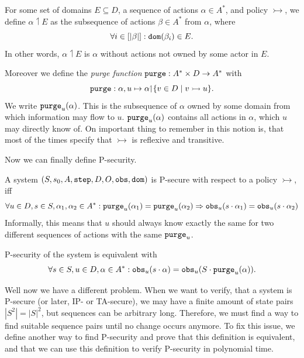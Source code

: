\begin{definition}
    For some set of domains \(E \subseteq D\), a sequence of actions \(\alpha \in A^*\), and policy \(\rightarrowtail\), we define \(\alpha {\upharpoonleft} E\) as the subsequence of actions \(\beta \in A^*\) from \(\alpha\), where \[\forall i \in [|\beta|]: \texttt{dom}(\beta_i) \in E.\]
    In other words, \(\alpha {\upharpoonleft} E\) is \(\alpha\) without actions not owned by some actor in \(E\).

    Moreover we define the \emph{purge function} \(\texttt{purge} : A^* \times D \rightarrow A^*\) with
    \[\texttt{purge} : \alpha, u \mapsto \alpha {\upharpoonleft} \{v \in D \mid v \rightarrowtail u\}.\]
    We write \(\texttt{purge}_u(\alpha)\).
    This is the subsequence of \(\alpha\) owned by some domain from which information may flow to \(u\).
    \(\texttt{purge}_u(\alpha)\) contains all actions in \(\alpha\), which \(u\) may directly know of.
    On important thing to remember in this notion is, that most of the times specify that \(\rightarrowtail\) is reflexive and transitive.
\end{definition}

Now we can finally define P-security.

\begin{definition}[P-Security]
    A system \((S, s_0, A, \texttt{step}, D, O, \texttt{obs}, \texttt{dom})\) is P-secure with respect to a policy \(\rightarrowtail\), iff
    \[\forall u \in D, s \in S, \alpha_1, \alpha_2 \in A^*: \texttt{purge}_u(\alpha_1) = \texttt{purge}_u(\alpha_2) \Rightarrow \texttt{obs}_u(s \cdot \alpha_1) = \texttt{obs}_u(s \cdot \alpha_2)\]
    Informally, this means that \(u\) should always know exactly the same for two different sequences of actions with the same \(\texttt{purge}_u\).

    P-security of the system is equivalent with
    \[\forall s \in S, u \in D, \alpha \in A^*: \texttt{obs}_u(s \cdot \alpha) = \texttt{obs}_u(S \cdot \texttt{purge}_u(\alpha)).\]
\end{definition}

Well now we have a different problem.
When we want to verify, that a system is P-secure (or later, IP- or TA-secure), we may have a finite amount of state pairs \(|S^2| = |S|^2\), but sequences can be arbitrary long.
Therefore, we must find a way to find suitable sequence pairs until no change occurs anymore.
To fix this issue, we define another way to find P-security and prove that this definition is equivalent, and that we can use this definition to verify P-security in polynomial time.

